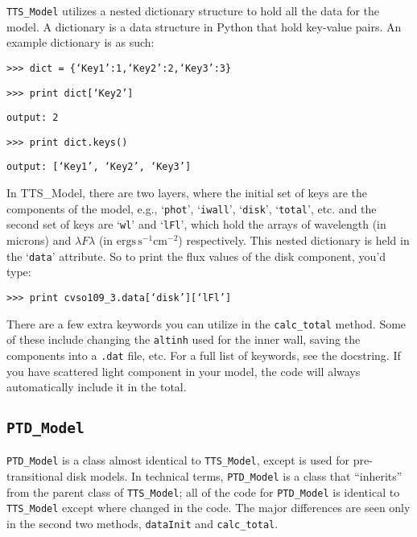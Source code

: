 \documentclass{article}
\begin{document}
\texttt{TTS\_Model} utilizes a nested dictionary structure to hold all the data for the model. A dictionary is a data structure in Python that hold key-value pairs. An example dictionary is as such: 
 
\vspace{2mm}
\texttt{>>> dict = \{‘Key1’:1,‘Key2’:2,‘Key3’:3\}}

\texttt{>>> print dict[‘Key2’]}

\texttt{output: 2 }

\texttt{>>> print dict.keys() }

\texttt{output: [‘Key1’, ‘Key2’, ‘Key3’] }
\vspace{2mm}
 
In TTS\_Model, there are two layers, where the initial set of keys are the components of the model, e.g., `\texttt{phot}', `\texttt{iwall}', `\texttt{disk}', `\texttt{total}', etc. and the second set of keys are `\texttt{wl}' and `\texttt{lFl}’, which hold the arrays of wavelength (in microns) and $\lambda F\lambda $ (in $\mbox{ergs}\, \mbox{s}^{-1} \mbox{cm}^{-2}$) respectively. This nested dictionary is held in the ‘\texttt{data}’ attribute. So to print the flux values of the disk component, you’d type: 
 
\vspace{2mm}
\texttt{>>> print cvso109\_3.data[‘disk’][‘lFl’]}
\vspace{2mm}

\noindent There are a few extra keywords you can utilize in the \texttt{calc\_total} method. Some of these include changing the \texttt{altinh} used for the inner wall, saving the components into a \texttt{.dat} file, etc. For a full list of keywords, see the docstring. If you have scattered light component in your model, the code will always automatically include it in the total. 
 
\subsection{\texttt{PTD\_Model}}
 
\texttt{PTD\_Model} is a class almost identical to \texttt{TTS\_Model}, except is used for pre-transitional disk models. In technical terms, \texttt{PTD\_Model} is a class that “inherits” from the parent class of \texttt{TTS\_Model}; all of the code for \texttt{PTD\_Model} is identical to \texttt{TTS\_Model} except where changed in the code. The major differences are seen only in the second two methods, \texttt{dataInit} and \texttt{calc\_total}.
\vspace{2mm}
\end{document}
